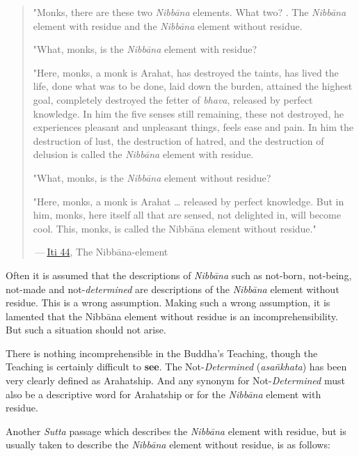 \begin{quotation}
"Monks, there are these two \emph{Nibbāna} elements. What two? . The
\emph{Nibbāna} element with residue and the \emph{Nibbāna} element without
residue.


"What, monks, is the \emph{Nibbāna} element with residue?


"Here, monks, a monk is Arahat, has destroyed the taints, has lived the
life, done what was to be done, laid down the burden, attained the
highest goal, completely destroyed the fetter of \emph{bhava}, released by
perfect knowledge. In him the five senses still remaining, these not
destroyed, he experiences pleasant and unpleasant things, feels ease and
pain. In him the destruction of lust, the destruction of hatred, and the
destruction of delusion is called the \emph{Nibbāna} element with residue.


"What, monks, is the \emph{Nibbāna} element without residue?


"Here, monks, a monk is Arahat …​ released by perfect knowledge. But in
him, monks, here itself all that are sensed, not delighted in, will
become cool. This, monks, is called the Nibbāna element without
residue."


 — \href{https://suttacentral.net/iti44/en/ireland}{Iti 44}, The Nibbāna-element


\end{quotation}

Often it is assumed that the descriptions of \emph{Nibbāna} such as not-born,
not-being, not-made and not-\emph{determined} are descriptions of the
\emph{Nibbāna} element without residue. This is a wrong assumption. Making
such a wrong assumption, it is lamented that the Nibbāna element without
residue is an incomprehensibility. But such a situation should not
arise.


There is nothing incomprehensible in the Buddha’s Teaching, though the
Teaching is certainly difficult to \textbf{see}. The Not-\emph{Determined}
(\emph{asañkhata}) has been very clearly defined as Arahatship. And any
synonym for Not-\emph{Determined} must also be a descriptive word for
Arahatship or for the \emph{Nibbāna} element with residue.


Another \emph{Sutta} passage which describes the \emph{Nibbāna} element with
residue, but is usually taken to describe the \emph{Nibbāna} element without
residue, is as follows:


